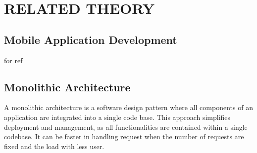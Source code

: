 \chapter{RELATED THEORY}

\section{Mobile Application Development}
for ref

\section{Monolithic Architecture}
A monolithic architecture is a software design pattern where all components of an application are integrated into a single code base. This approach simplifies deployment and management, as all functionalities are contained within a single codebase. It can be faster in handling request when the number of requests are fixed and the load with less user. 

